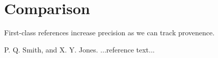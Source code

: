 \documentclass[preprint]{sigplanconf}
\begin{document}
\section{Comparison}

First-class references increase precision as we can track provenence.







\begin{thebibliography}{}
\softraggedright

P. Q. Smith, and X. Y. Jones. ...reference text...

\end{thebibliography}
\end{document}

